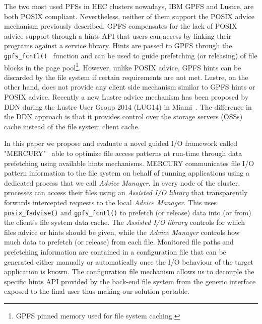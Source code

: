 The two most used PFSs in HEC clusters nowadays, IBM GPFS and Lustre, are both POSIX compliant. Nevertheless, neither of them support the POSIX advice mechanism previously described. GPFS compensates for the lack of POSIX advice support through a hints API that users can access by linking their programs against a service library. Hints are passed to GPFS through the \texttt{gpfs\_fcntl()}~\cite{GPFSHINTS} function and can be used to guide prefetching (or releasing) of file blocks in the page pool\footnote{GPFS pinned memory used for file system caching.}. However, unlike POSIX advice, GPFS hints %
can be discarded by the file system if certain requirements are not met. Lustre, on the other hand, does not provide any client side mechanism similar to GPFS hints or POSIX advice. Recently a new Lustre advice mechanism has been proposed by DDN during the Lustre User Group 2014 (LUG14) in Miami~\cite{Comer14}. The difference in the DDN approach is that it provides control over the storage servers (OSSs) cache instead of the file system client cache.

In this paper we propose and evaluate a novel guided I/O framework called "MERCURY"~\cite{mercury} able to optimize file access patterns at run-time through data prefetching using available hints mechanisms. MERCURY communicates file I/O pattern information to the file system on behalf of running applications using a dedicated process that we call \textit{Advice Manager}. In every node of the cluster, processes can access their files using an \textit{Assisted I/O library} that transparently forwards intercepted requests to the local \textit{Advice Manager}. This uses \texttt{posix\_fadvise()} and \texttt{gpfs\_fcntl()} to prefetch (or release) data into (or from) the client's file system data cache. The \textit{Assisted I/O library} controls for which files advice or hints should be given, while the \textit{Advice Manager} controls how much data to prefetch (or release) from each file. Monitored file paths and prefetching information are contained in a configuration file that can be generated either manually or automatically once the I/O behaviour of the target application is known. The configuration file mechanism allows us to decouple the specific hints API provided by the back-end file system from the generic interface exposed to the final user thus making our solution portable.


